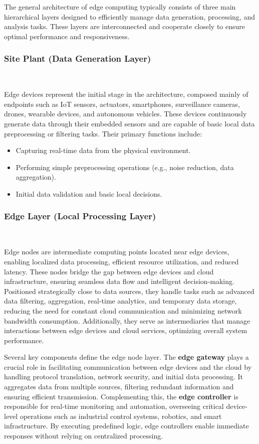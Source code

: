\documentclass[runningheads]{llncs}
\begin{document}
The general architecture of edge computing typically consists of three main hierarchical layers designed to efficiently manage data generation, processing, and analysis tasks. These layers are interconnected and cooperate closely to ensure optimal performance and responsiveness.


\subsubsection{Site Plant (Data Generation Layer)}\

\vspace{0.2cm}
Edge devices represent the initial stage in the architecture, composed mainly of endpoints such as IoT sensors, actuators, smartphones, surveillance cameras, drones, wearable devices, and autonomous vehicles. These devices continuously generate data through their embedded sensors and are capable of basic local data preprocessing or filtering tasks. Their primary functions include:
\begin{itemize}
    \item Capturing real-time data from the physical environment.
    \item Performing simple preprocessing operations (e.g., noise reduction, data aggregation).
    \item Initial data validation and basic local decisions.
\end{itemize}

\subsubsection{Edge Layer (Local Processing Layer)}\
\vspace{0.2cm}

Edge nodes are intermediate computing points located near edge devices, enabling localized data processing, efficient resource utilization, and reduced latency. These nodes bridge the gap between edge devices and cloud infrastructure, ensuring seamless data flow and intelligent decision-making. Positioned strategically close to data sources, they handle tasks such as advanced data filtering, aggregation, real-time analytics, and temporary data storage, reducing the need for constant cloud communication and minimizing network bandwidth consumption. Additionally, they serve as intermediaries that manage interactions between edge devices and cloud services, optimizing overall system performance. 

Several key components define the edge node layer. The \textbf{edge gateway} plays a crucial role in facilitating communication between edge devices and the cloud by handling protocol translation, network security, and initial data processing. It aggregates data from multiple sources, filtering redundant information and ensuring efficient transmission. Complementing this, the \textbf{edge controller} is responsible for real-time monitoring and automation, overseeing critical device-level operations such as industrial control systems, robotics, and smart infrastructure. By executing predefined logic, edge controllers enable immediate responses without relying on centralized processing.  
\end{document}

